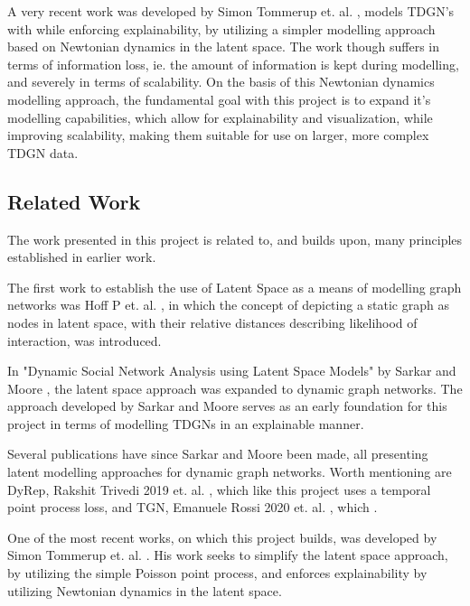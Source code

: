 A very recent work was developed by Simon Tommerup et. al. \cite{Tommerup2021LearningNetworks}, models TDGN's with while enforcing explainability, by utilizing a simpler modelling approach based on Newtonian dynamics in the latent space.
The work though suffers in terms of information loss, ie. the amount of information is kept during modelling, and severely in terms of scalability.
On the basis of this Newtonian dynamics modelling approach, the fundamental goal with this project is to expand it's modelling capabilities, which allow for explainability and visualization, while improving scalability, making them suitable for use on larger, more complex TDGN data.



\subsection{Related Work}
\label{sec:Intro:RelatedWork}
The work presented in this project is related to, and builds upon, many principles established in earlier work.

The first work to establish the use of Latent Space as a means of modelling graph networks was Hoff P et. al. \cite{Hoff2002LatentAnalysis}, in which the concept of depicting a static graph as nodes in latent space, with their relative distances describing likelihood of interaction, was introduced.

In "Dynamic Social Network Analysis using Latent Space Models" by Sarkar and Moore \cite{Sarkar2005DynamicModels}, the latent space approach was expanded to dynamic graph networks.
The approach developed by Sarkar and Moore serves as an early foundation for this project in terms of modelling TDGNs in an explainable manner.

Several publications have since Sarkar and Moore been made, all presenting latent modelling approaches for dynamic graph networks. 
Worth mentioning are DyRep, Rakshit Trivedi 2019 et. al. \cite{TrivediDYREP:GRAPHS}, which like this project uses a temporal point process loss, and TGN, Emanuele Rossi 2020 et. al. \cite{RossiTEMPORALGRAPHS}, which .
 
One of the most recent works, on which this project builds, was developed by Simon Tommerup et. al. \cite{Tommerup2021LearningNetworks}.
His work seeks to simplify the latent space approach, by utilizing the simple Poisson point process, and enforces explainability by utilizing Newtonian dynamics in the latent space.




